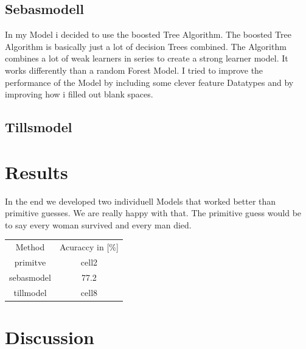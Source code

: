 \documentclass[
   10.5pt,
   invert-title=true,
   titlepage=false,
   titleimage-ratio=13,
   class=article
]{bfhpub}				%
\begin{document}
\subsection*{Sebasmodell}
In my Model i decided to use the boosted Tree Algorithm. The boosted Tree Algorithm is basically just a lot of decision Trees combined. The Algorithm combines a lot of weak learners in series to create a strong learner model. It works differently than a random Forest Model.
I tried to improve the performance of the Model by including some clever feature Datatypes and by improving how i filled out blank spaces.

\subsection*{Tillsmodel}

\section*{Results}
In the end we developed two individuell Models that worked better than primitive guesses. We are really happy with that. The primitive guess would be to say every woman survived and every man died.

\begin{center}
	\begin{tabular}{ c c }
		Method & Acuraccy in [\%] \\
		primitve & cell2 \\ 
		sebasmodel & 77.2 \\
		tillmodel & cell8    
	\end{tabular}
\end{center}

\section*{Discussion}



\end{document}
